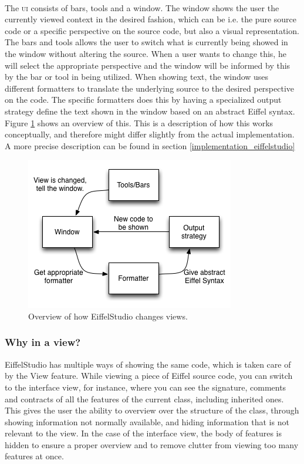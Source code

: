 \paragraph{}
The \textsc{ui} consists of bars, tools and a window. The window shows the user the currently viewed context in the desired fashion, which can be i.e. the pure source code or a specific perspective on the source code, but also a visual representation. The bars and tools allows the user to switch what is currently being showed in the window without altering the source. When a user wants to change this, he will select the appropriate perspective and the window will be informed by this by the bar or tool in being utilized. When showing text, the window uses different formatters to translate the underlying source to the desired perspective on the code. The specific formatters does this by having a specialized output strategy define the text shown in the window based on an abstract Eiffel syntax. Figure \ref{fig:eiffelstudio_view_change} shows an overview of this. This is a description of how this works conceptually, and therefore might differ slightly from the actual implementation. A more precise description can be found in section \ref{implementation_eiffelstudio}

\begin{figure}[H]
\centerline{
\includegraphics[scale=0.7]{images/eiffel_view_text_design.png}
}
\caption[EiffelStudio view control]{Overview of how EiffelStudio changes views.}
\label{fig:eiffelstudio_view_change}
\end{figure}

\subsubsection{Why in a view?}
\label{why_a_view}
EiffelStudio has multiple ways of showing the same code, which is taken care of by the View feature. While viewing a piece of Eiffel source code, you can switch to the interface view, for instance, where you can see the signature, comments and contracts of all the features  of the current class, including inherited ones. This gives the user the ability to overview over the structure of the class, through showing information not normally available, and hiding information that is not relevant to the view. In the case of the interface view, the body of features is hidden to ensure a proper overview and to remove clutter from viewing too many features at once.
